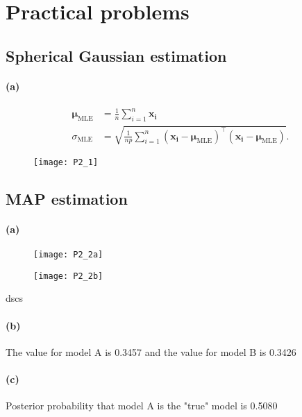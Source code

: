 \documentclass[a4paper,11pt]{article}
\begin{document}
\section{Practical problems}
\subsection{Spherical Gaussian estimation}
\paragraph{(a)}
\begin{align*}
\boldsymbol\mu_\mathrm{\scriptscriptstyle{MLE}}&=\frac{1}{n}\sum_{i=1}^n\mathbf{x_i}\\
\sigma_\mathrm{\scriptscriptstyle{MLE}}&=\sqrt{\frac{1}{np}\sum_{i=1}^n(\mathbf{x_i}-\boldsymbol\mu_\mathrm{\scriptscriptstyle{MLE}})^\top(\mathbf{x_i}-\boldsymbol\mu_\mathrm{\scriptscriptstyle{MLE}})}.
\end{align*}

\begin{figure}[h!]
  \begin{center}
    \texttt{[image: P2\_1]}
  \end{center}
\end{figure}
\subsection{MAP estimation}
\paragraph{(a)}
\begin{figure}
	\begin{center}
		\texttt{[image: P2\_2a]}
	\end{center}
\end{figure}
\begin{figure}
	\begin{center}
		\texttt{[image: P2\_2b]}
	\end{center}
\end{figure}
dscs
\paragraph{(b)}
The value for model A is 0.3457 and the value for model B is 0.3426\\
\paragraph{(c)}
Posterior probability that model A is the "true" model is 0.5080\\
\end{document}
